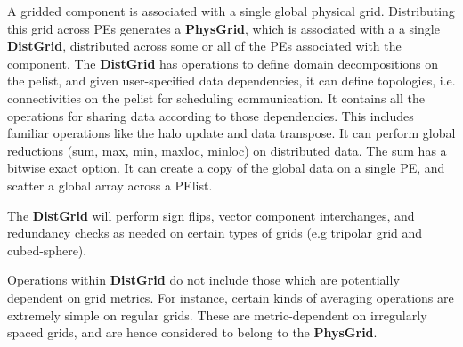 A gridded component is associated with a single global physical grid.
Distributing this grid across PEs generates a \textbf{PhysGrid}, which
is associated with a a single \textbf{DistGrid}, distributed across
some or all of the PEs associated with the component. The
\textbf{DistGrid} has operations to define domain decompositions on
the pelist, and given user-specified data dependencies, it can define
topologies, i.e. connectivities on the pelist for
scheduling communication. It contains all the operations for sharing
data according to those dependencies.  This includes familiar
operations like the halo update and data transpose. It can perform
global reductions (sum, max, min, maxloc, minloc) on distributed data.
The sum has a bitwise exact option. It can create a copy of the global
data on a single PE, and scatter a global array across a PElist.

The \textbf{DistGrid} will perform sign flips, vector component interchanges,
and redundancy checks as needed on certain types of grids (e.g
tripolar grid and cubed-sphere).

Operations within \textbf{DistGrid} do not include those which are
potentially dependent on grid metrics. For instance, certain kinds of
averaging operations are extremely simple on regular grids. These are
metric-dependent on irregularly spaced grids, and are hence considered
to belong to the \textbf{PhysGrid}.

